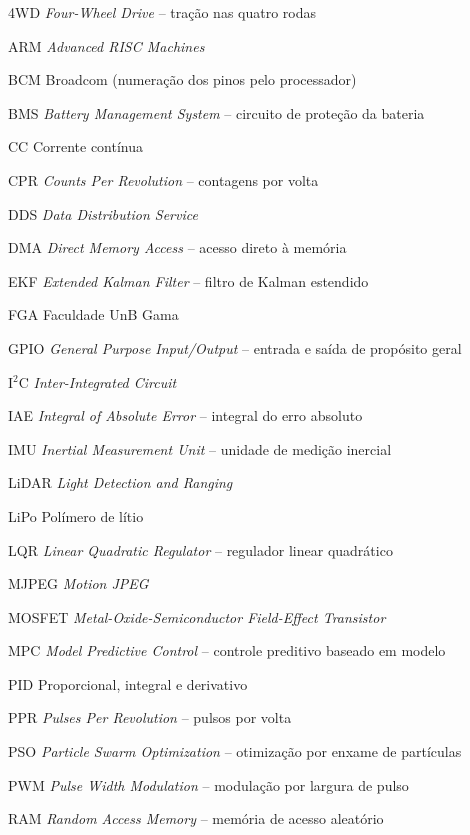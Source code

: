\begin{siglas}
  \item[4WD] \textit{Four-Wheel Drive} -- tração nas quatro rodas
  \item[ARM] \textit{Advanced RISC Machines}
  \item[BCM] Broadcom (numeração dos pinos pelo processador)
  \item[BMS] \textit{Battery Management System} -- circuito de proteção da bateria
  \item[CC] Corrente contínua
  \item[CPR] \textit{Counts Per Revolution} -- contagens por volta
  \item[DDS] \textit{Data Distribution Service}
  \item[DMA] \textit{Direct Memory Access} -- acesso direto à memória
  \item[EKF] \textit{Extended Kalman Filter} -- filtro de Kalman estendido
  \item[FGA] Faculdade UnB Gama
  \item[GPIO] \textit{General Purpose Input/Output} -- entrada e saída de propósito geral
  \item[I$^2$C] \textit{Inter-Integrated Circuit}
  \item[IAE] \textit{Integral of Absolute Error} -- integral do erro absoluto
  \item[IMU] \textit{Inertial Measurement Unit} -- unidade de medição inercial
  \item[LiDAR] \textit{Light Detection and Ranging}
  \item[LiPo] Polímero de lítio
  \item[LQR] \textit{Linear Quadratic Regulator} -- regulador linear quadrático
  \item[MJPEG] \textit{Motion JPEG}
  \item[MOSFET] \textit{Metal-Oxide-Semiconductor Field-Effect Transistor}
  \item[MPC] \textit{Model Predictive Control} -- controle preditivo baseado em modelo
  \item[PID] Proporcional, integral e derivativo
  \item[PPR] \textit{Pulses Per Revolution} -- pulsos por volta
  \item[PSO] \textit{Particle Swarm Optimization} -- otimização por enxame de partículas
  \item[PWM] \textit{Pulse Width Modulation} -- modulação por largura de pulso
  \item[RAM] \textit{Random Access Memory} -- memória de acesso aleatório

\end{siglas}
